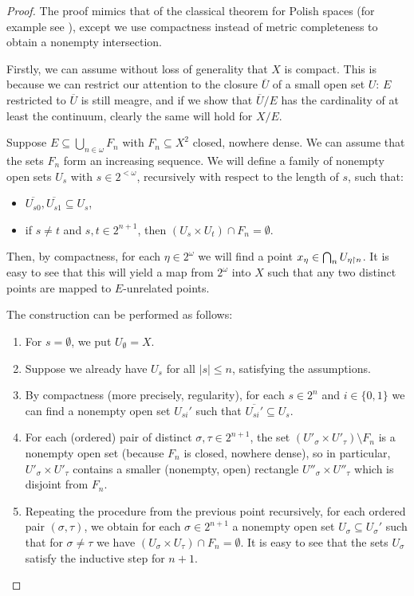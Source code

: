 	\begin{proof}
		The proof mimics that of the classical theorem for Polish spaces (for example see \cite[Theorem 5.3.1]{SuG}), except we use compactness instead of metric completeness to obtain a nonempty intersection.
		
		Firstly, we can assume without loss of generality that $X$ is compact. This is because we can restrict our attention to the closure $\overline U$ of a small open set $U$: $E$ restricted to $\overline U$ is still meagre, and if we show that $\overline U/E$ has the cardinality of at least the continuum, clearly the same will hold for $X/E$.
		
		
		Suppose $E\subseteq \bigcup_{n\in \omega} F_n$ with $F_n\subseteq X^2$ closed, nowhere dense. We can assume
		that the sets $F_n$ form an increasing sequence. We will define a family of nonempty open sets $U_s$ with $s\in 2^{<\omega}$, recursively with respect to the length of $s$, such that:
		\begin{itemize}
			\item
			$\overline{U_{s0}},\overline{U_{s1}}\subseteq U_s$,
			\item
			if $s\neq t$ and $s,t\in 2^{n+1}$, then $(U_s\times U_t)\cap F_n=\emptyset$.
		\end{itemize}
		
		Then, by compactness, for each $\eta\in 2^\omega$ we will find a point $x_\eta\in \bigcap_n U_{\eta\mathord{\upharpoonright} n}$. It is easy to see that this will yield a map from $2^\omega$ into $X$ such that any two distinct points are mapped to $E$-unrelated points.
		
		The construction can be performed as follows:
		\begin{enumerate}
			\item
			For $s=\emptyset$, we put $U_\emptyset=X$.
			\item
			Suppose we already have $U_s$ for all $\lvert s\rvert \leq n$, satisfying the assumptions.
			\item
			By compactness (more precisely, regularity), for each $s\in 2^n$ and $i\in\{0,1\}$ we can find a nonempty open set $U_{si}'$ such that $\overline{U_{si}'}\subseteq U_s$.
			\item
			For each (ordered) pair of distinct $\sigma,\tau\in 2^{n+1}$, the set $(U'_\sigma\times U'_\tau)\setminus F_n$ is a nonempty open set (because $F_n$ is closed, nowhere dense), so in particular, $U'_\sigma\times U'_\tau$ contains a smaller (nonempty, open) rectangle $U''_\sigma\times U''_\tau$ which is disjoint from $F_n$.
			\item
			Repeating the procedure from the previous point recursively, for each ordered pair $(\sigma,\tau)$, we obtain for each $\sigma\in 2^{n+1}$ a nonempty open set $U_\sigma\subseteq U_\sigma'$ such that for $\sigma\neq \tau$ we have $(U_\sigma\times U_\tau)\cap F_n=\emptyset$. It is easy to see that the sets $U_\sigma$ satisfy the inductive step for $n+1$.\qedhere
		\end{enumerate}
	\end{proof}
	
